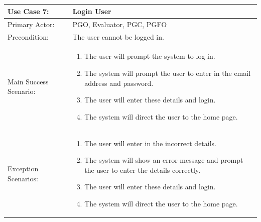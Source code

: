 \documentclass{article}
\begin{document}
\\ \\ \\ \\
\begin{tabular} {| m{5cm} | m{10cm} |}
\hline
Use Case 7: & Login User \\
\hline
Primary Actor: & PGO, Evaluator, PGC, PGFO \\
\hline
Precondition: & The user cannot be logged in.  \\
\hline
Main Success Scenario: & \begin{enumerate} \itemsep0em \item The user will prompt the system to log in.
\item The system will prompt the user to enter in the email address and password.
\item The user will enter these details and login.
\item The system will direct the user to the home page.
\end{enumerate}\\
\hline
Exception Scenarios: & \begin{enumerate} \itemsep0em \item The user will enter in the incorrect details.
\item The system will show an error message and prompt the user to enter the details correctly.
\item The user will enter these details and login.
\item The system will direct the user to the home page.
\end{enumerate}\\
\hline
\end{tabular}
\\ \\ \\ \\
\end{document}

